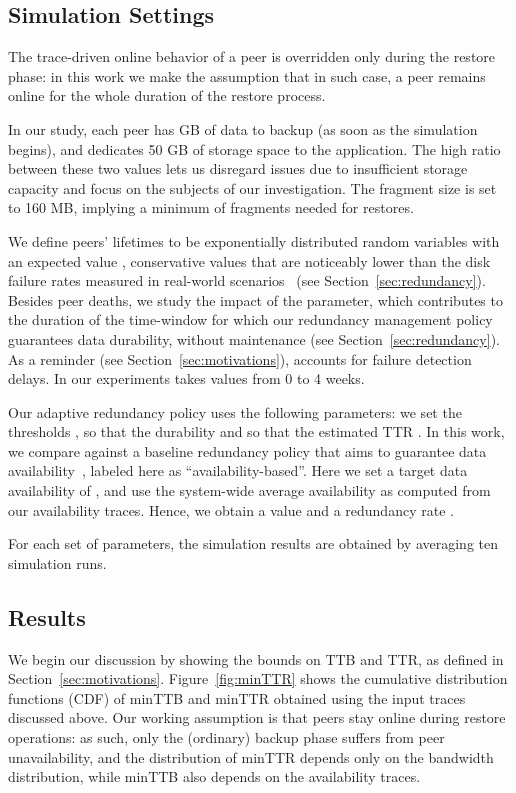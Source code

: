 \subsection{Simulation Settings}
The trace-driven online behavior of a peer is overridden only during
the restore phase: in this work we make the assumption that in such
case, a peer remains online for the whole duration of the restore
process.

In our study, each peer has  GB of data to backup (as soon as
the simulation begins), and dedicates 50 GB of storage space to the
application. The high ratio between these two values lets us disregard
issues due to insufficient storage capacity and focus on the subjects
of our investigation. The fragment size is set to 160 MB, implying a
minimum of  fragments needed for restores.

We define peers' lifetimes to be exponentially distributed random
variables with an expected value , conservative values that are
noticeably lower than the disk failure rates measured in real-world
scenarios~\cite{fast07} (see Section~\ref{sec:redundancy}).  Besides peer
deaths, we study the impact of the  parameter, which contributes to
the duration of the time-window for which our redundancy management
policy guarantees data durability, without maintenance (see
Section~\ref{sec:redundancy}).  As a reminder (see
Section~\ref{sec:motivations}),  accounts for failure detection
delays. In our experiments  takes values from 0 to 4 weeks.

Our adaptive redundancy policy uses the following parameters: we set
the thresholds , so that the durability  and  so that the estimated TTR . In
this work, we compare against a baseline redundancy policy that aims
to guarantee data availability~\cite{Kiran04totalrecall}, labeled here
as ``availability-based''. Here we set a target data availability of
, and use the system-wide average availability  as
computed from our availability traces. Hence, we obtain a value
 and a redundancy rate .

For each set of parameters, the simulation results are obtained by
averaging ten simulation runs.

\subsection{Results}
\label{sec:results}

We begin our discussion by showing the bounds on TTB and TTR, as
defined in Section~\ref{sec:motivations}. Figure~\vref{fig:minTTR} shows
the cumulative distribution functions (CDF) of minTTB and minTTR
obtained using the input traces discussed above. Our working
assumption is that peers stay online during restore operations: as
such, only the (ordinary) backup phase suffers from peer
unavailability, and the distribution of minTTR depends only on the
bandwidth distribution, while minTTB also depends on the availability
traces.

